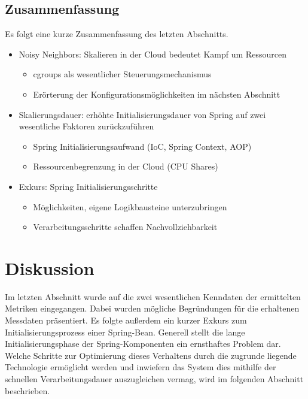 \begin{minipage}{\textwidth}
\subsection{Zusammenfassung}

Es folgt eine kurze Zusammenfassung des letzten Abschnitts.

\begin{itemize}
	\item Noisy Neighbors: Skalieren in der Cloud bedeutet Kampf um Ressourcen
	\begin{itemize}
		\item cgroups als wesentlicher Steuerungsmechanismus
		\item Erörterung der Konfigurationsmöglichkeiten im nächsten Abschnitt
	\end{itemize}
	\item Skalierungsdauer: erhöhte Initialisierungsdauer von Spring auf zwei wesentliche Faktoren zurückzuführen
	\begin{itemize}
		\item Spring Initialisierungsaufwand (IoC, Spring Context, AOP)
		\item Ressourcenbegrenzung in der Cloud (CPU Shares)
	\end{itemize}
	\item Exkurs: Spring Initialisierungsschritte
	\begin{itemize}
		\item Möglichkeiten, eigene Logikbausteine unterzubringen
		\item Verarbeitungsschritte schaffen Nachvollziehbarkeit
	\end{itemize}
\end{itemize}
\end{minipage}

\section{Diskussion}
\label{sec:diskussion}
Im letzten Abschnitt wurde auf die zwei wesentlichen Kenndaten der ermittelten Metriken eingegangen. Dabei wurden mögliche Begründungen für die erhaltenen Messdaten präsentiert. Es folgte außerdem ein kurzer Exkurs zum Initialisierungsprozess einer Spring-Bean. Generell stellt die lange Initialisierungsphase der Spring-Komponenten ein ernsthaftes Problem dar. Welche Schritte zur Optimierung dieses Verhaltens durch die zugrunde liegende Technologie ermöglicht werden und inwiefern das System dies mithilfe der schnellen Verarbeitungsdauer auszugleichen vermag, wird im folgenden Abschnitt beschrieben. 

